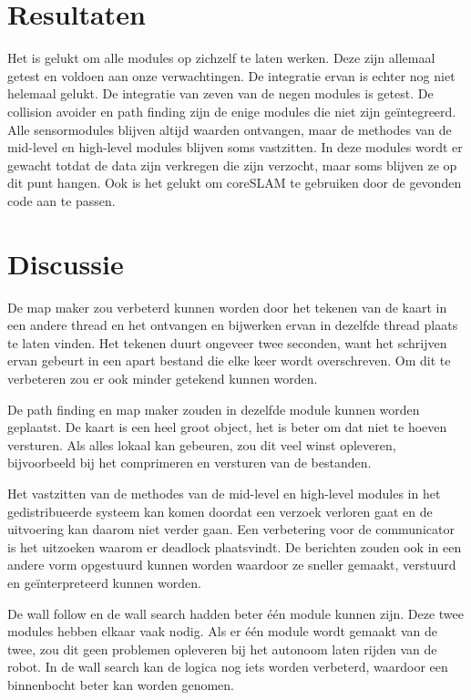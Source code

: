\documentclass[a4paper,10pt]{article}
\begin{document}
\section{Resultaten}
Het is gelukt om alle modules op zichzelf te laten werken. Deze zijn allemaal getest en voldoen aan onze verwachtingen. De integratie ervan is echter nog niet helemaal gelukt. De integratie van zeven van de negen modules is getest. De collision avoider en path finding zijn de enige modules die niet zijn ge\"{i}ntegreerd. Alle sensormodules blijven altijd waarden ontvangen, maar de methodes van de mid-level en high-level modules blijven soms vastzitten. In deze modules wordt er gewacht totdat de data zijn verkregen die zijn verzocht, maar soms blijven ze op dit punt hangen. Ook is het gelukt om coreSLAM te gebruiken door de gevonden code aan te passen.

\section{Discussie}
De map maker zou verbeterd kunnen worden door het tekenen van de kaart in een andere thread en het ontvangen en bijwerken ervan in dezelfde thread plaats te laten vinden. Het tekenen duurt ongeveer twee seconden, want het schrijven ervan gebeurt in een apart bestand die elke keer wordt overschreven. Om dit te verbeteren zou er ook minder getekend kunnen worden. 

De path finding en map maker zouden in dezelfde module kunnen worden geplaatst. De kaart is een heel groot object, het is beter om dat niet te hoeven versturen. Als alles lokaal kan gebeuren, zou dit veel winst opleveren, bijvoorbeeld bij het comprimeren en versturen van de bestanden.

Het vastzitten van de methodes van de mid-level en high-level modules in het gedistribueerde systeem kan komen doordat een verzoek verloren gaat en de uitvoering kan daarom niet verder gaan. Een verbetering voor de communicator is het uitzoeken waarom er deadlock plaatsvindt. De berichten zouden ook in een andere vorm opgestuurd kunnen worden waardoor ze sneller gemaakt, verstuurd en ge\"{i}nterpreteerd kunnen worden.

De wall follow en de wall search hadden beter \'{e}\'{e}n module kunnen zijn. Deze twee modules hebben elkaar vaak nodig. Als er \'{e}\'{e}n module wordt gemaakt van de twee, zou dit geen problemen opleveren bij het autonoom laten rijden van de robot. In de wall search kan de logica nog iets worden verbeterd, waardoor een binnenbocht beter kan worden genomen.
\end{document}
